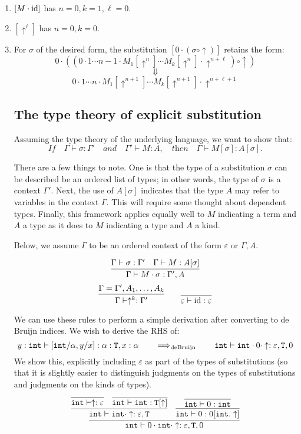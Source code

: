 \begin{enumerate}[1.]
  \item $[M \cdot \operatorname{id}]$ has $n = 0, k = 1, \ell = 0$.
  \item $[ \uparrow^\ell ]$ has $n = 0, k = 0$.
  \item For $\sigma$ of the desired form, the substitution $[0 \cdot (\sigma \circ \uparrow)]$ retains the form:
    $$0 \cdot (( 0 \cdot 1 \cdots n-1 \cdot M_1[\uparrow^n] \cdots M_k[\uparrow^n] \cdot \uparrow^{n+\ell}) \circ \uparrow)$$
    $$\Downarrow$$
    $$0 \cdot 1 \cdots n \cdot M_1[\uparrow^{n+1}] \cdots M_k[\uparrow^{n+1}] \cdot \uparrow^{n+\ell+1}$$

\subsection{The type theory of explicit substitution}
Assuming the type theory of the underlying language, we want to show that:
\[  \textit{If} \quad \Gamma \vdash \sigma : \Gamma'
     \quad \textit{and} \quad \Gamma' \vdash M : A, \quad \textit{then} \quad \Gamma \vdash M[\sigma] : A[\sigma].
\]

There are a few things to note. One is that the type of a substitution $\sigma$ can be described be
an ordered list of types; in other words, the type of $\sigma$ is a context $\Gamma'$. Next,
the use of $A[\sigma]$ indicates that the type $A$ may refer to variables in the context $\Gamma$.
This will require some thought about dependent types. Finally, this framework applies
equally well to $M$ indicating a term and $A$ a type as it does to $M$ indicating a type
and $A$ a kind.

Below, we assume $\Gamma$ to be an ordered context of the form $\varepsilon$ or $\Gamma, A$.
\begin{judgment}
\[
  \infer{\Gamma \vdash M \cdot \sigma : \Gamma', A}
    {\Gamma \vdash \sigma : \Gamma' & \Gamma \vdash M : A[\sigma]}
\]
\[
  \infer{\Gamma \vdash \uparrow^k : \Gamma'}
    {\Gamma = \Gamma', A_1, \ldots, A_k}
  \qquad
  \infer{\varepsilon \vdash \id : \varepsilon}{}
\]
\end{judgment}

We can use these rules to perform a simple derivation after converting to de Bruijn indices.
We wish to derive the RHS of:
\[
  y : \mathtt{int} \vdash [\mathtt{int}/\alpha, y/x] : \alpha : \mathtt{T}, x : \alpha
    \qquad \Longrightarrow_\textnormal{deBruijn} \qquad
    \mathtt{int} \vdash \mathtt{int} \cdot 0 \cdot \uparrow : \varepsilon, \mathtt{T}, 0
\]
We show this, explicitly including $\varepsilon$ as part of the types of substitutions
(so that it is slightly easier to distinguish judgments on the types of substitutions
and judgments on the kinds of types).
\[
  \infer
    {\int \vdash 0 \cdot \int \cdot \uparrow : \varepsilon, \T, 0}
    {\infer
       {\int \vdash \int \cdot \uparrow : \varepsilon, \T}
       {\infer
          {\int \vdash \uparrow : \varepsilon}
          {}
       &\infer
          {\int \vdash \int : \T[\uparrow]}
          {}
       }
    &\infer
       {\int \vdash 0 : 0[\int.\uparrow]}
       {\infer
          {\int \vdash 0 : \int}
          {}
       }
    }
\]


\end{enumerate}
